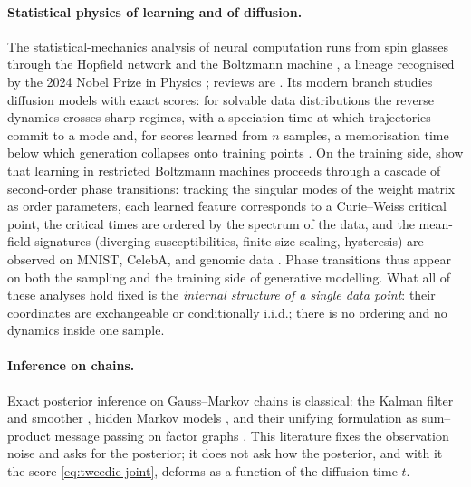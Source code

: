 \paragraph{Statistical physics of learning and of diffusion.} The
statistical-mechanics analysis of neural computation runs from spin
glasses through the Hopfield network and the Boltzmann machine
\citep{edwards1975theory, hopfield1982neural, amit1985storing,
ackley1985learning, smolensky1986information, hinton2002training,
gardner1988space, mezard2017meanfield}, a lineage recognised by the 2024
Nobel Prize in Physics \citep{nobel2024physics}; reviews are
\citet{zdeborova2016statistical, carbone2025hitchhiker}. Its modern branch
studies diffusion models with exact scores: for solvable data
distributions the reverse dynamics crosses sharp regimes, with a
speciation time at which trajectories commit to a mode and, for scores
learned from $n$ samples, a memorisation time below which generation
collapses onto training points \citep{biroli2023generative,
biroli2024dynamical, raya2023spontaneous, ghio2024sampling}. On the
training side, \citet{bachtis2024cascade} show that learning in restricted
Boltzmann machines proceeds through a cascade of second-order phase
transitions: tracking the singular modes of the weight matrix as order
parameters, each learned feature corresponds to a Curie--Weiss critical
point, the critical times are ordered by the spectrum of the data, and the
mean-field signatures (diverging susceptibilities, finite-size scaling,
hysteresis) are observed on MNIST, CelebA, and genomic data
\citep[building on][]{saxe2014exact, decelle2017spectral,
tubiana2017emergence}. Phase transitions thus appear on both the sampling
and the training side of generative modelling. What all of these analyses
hold fixed is the \emph{internal structure of a single data point}: their
coordinates are exchangeable or conditionally i.i.d.; there is no ordering
and no dynamics inside one sample.

\paragraph{Inference on chains.} Exact posterior inference on Gauss--Markov
chains is classical: the Kalman filter and smoother
\citep{kalman1960new, rauch1965maximum}, hidden Markov models
\citep{rabiner1989tutorial}, and their unifying formulation as sum--product
message passing on factor graphs \citep{pearl1988probabilistic,
kschischang2001factor, koller2009probabilistic, mezard2009information,
bishop2006pattern}. This literature fixes the observation noise and asks
for the posterior; it does not ask how the posterior, and with it the
score \eqref{eq:tweedie-joint}, deforms as a function of the diffusion
time $t$.

